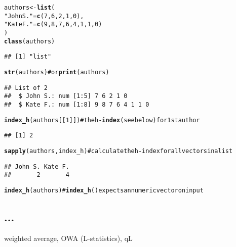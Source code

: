 \documentclass[11pt]{article}\usepackage{graphicx, color}
\makeatletter
\newcommand{\hlfunctioncall}[1]{\textcolor[rgb]{0.501960784313725,0,0.329411764705882}{\textbf{#1}}}%
\newcommand{\hlstring}[1]{\textcolor[rgb]{0.6,0.6,1}{#1}}%
\newcommand{\hlcomment}[1]{\textcolor[rgb]{0.180392156862745,0.6,0.341176470588235}{#1}}%
\newenvironment{kframe}{%
 \def\at@end@of@kframe{}%
 \ifinner\ifhmode%
  \def\at@end@of@kframe{\end{minipage}}%
  \begin{minipage}{\columnwidth}%
 \fi\fi%
 \def\FrameCommand##1{\hskip\@totalleftmargin \hskip-\fboxsep
 \colorbox{shadecolor}{##1}\hskip-\fboxsep
     \hskip-\linewidth \hskip-\@totalleftmargin \hskip\columnwidth}%
 \MakeFramed {\advance\hsize-\width
   \@totalleftmargin\z@ \linewidth\hsize
   \@setminipage}}%
 {\par\unskip\endMakeFramed%
 \at@end@of@kframe}
\newenvironment{knitrout}{}{} %
\theoremstyle{remark}
\theoremstyle{definition}
\makeatother
\begin{document}
\begin{knitrout}\small
{}\color{fgcolor}\begin{kframe}
\begin{alltt}
authors <- \hlfunctioncall{list}(
   \hlstring{"John S."} = \hlfunctioncall{c}(7,6,2,1,0),
   \hlstring{"Kate F."} = \hlfunctioncall{c}(9,8,7,6,4,1,1,0)
)
\hlfunctioncall{class}(authors)
\end{alltt}
\begin{verbatim}
## [1] "list"
\end{verbatim}
\begin{alltt}
\hlfunctioncall{str}(authors)   \hlcomment{# or \hlfunctioncall{print}(authors)}
\end{alltt}
\begin{verbatim}
## List of 2
##  $ John S.: num [1:5] 7 6 2 1 0
##  $ Kate F.: num [1:8] 9 8 7 6 4 1 1 0
\end{verbatim}
\begin{alltt}
\hlfunctioncall{index_h}(authors[[1]]) \hlcomment{# the h-\hlfunctioncall{index} (see below) for 1st author}
\end{alltt}
\begin{verbatim}
## [1] 2
\end{verbatim}
\begin{alltt}
\hlfunctioncall{sapply}(authors, index_h) \hlcomment{# calculate the h-index for all vectors in a list}
\end{alltt}
\begin{verbatim}
## John S. Kate F. 
##       2       4
\end{verbatim}
\begin{alltt}
\hlfunctioncall{index_h}(authors) \hlcomment{# \hlfunctioncall{index_h}() expects an numeric vector on input}
\end{alltt}


{\ttfamily\noindent\bfseries\color{errorcolor}{\#\# Error: argument `x` should be a numeric vector (or an object coercible to)}}\end{kframe}
\end{knitrout}




\subsection{...}



weighted average, OWA (L-statistics), qL
\end{document}
